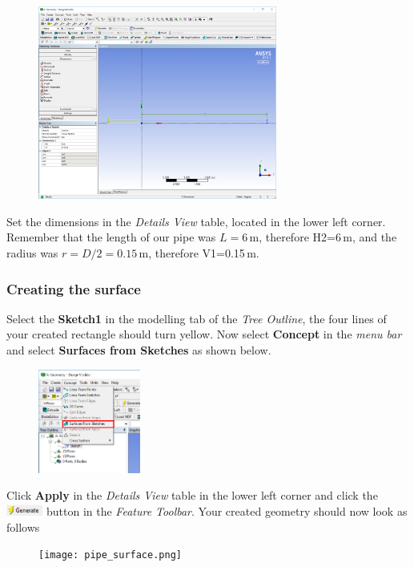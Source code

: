 \documentclass[11pt,a4paper,oneside]{scrartcl}
\newcommand\bfr[1]{\textcolor[rgb]{1,0.00,0.00}{\textbf{\textsf{#1}}}}
\begin{document}
\begin{figure}[H]
\begin{center}
\includegraphics[width=0.7\textwidth,clip]{rectangle_dimensions.png}
\end{center}
\end{figure}

Set the dimensions in the \emph{Details View} table, located in the lower left corner. Remember that the length of our pipe was $L=6$\,m, therefore H2=6\,m, and the radius was $r=D/2=0.15\,$m, therefore V1=0.15\,m.

\subsubsection{Creating the surface}

Select the \bfr{Sketch1} in the modelling tab of the \emph{Tree Outline}, the four lines of your created rectangle should turn yellow. Now select \bfr{Concept} in the \emph{menu bar} and select \bfr{Surfaces from Sketches} as shown below.
\begin{figure}[H]
\begin{center}
\includegraphics[width=0.3\textwidth,clip]{surfaces_from_sketches.png}
\end{center}
\end{figure}

Click \bfr{Apply} in the \emph{Details View} table in the lower left corner and click the \includegraphics[width=1.2cm]{generate_button.png} button in the \emph{Feature Toolbar}. Your created geometry should now look as follows
\begin{figure}[H]
\begin{center}
\texttt{[image: pipe\_surface.png]}
\end{center}
\end{figure}
\end{document}
